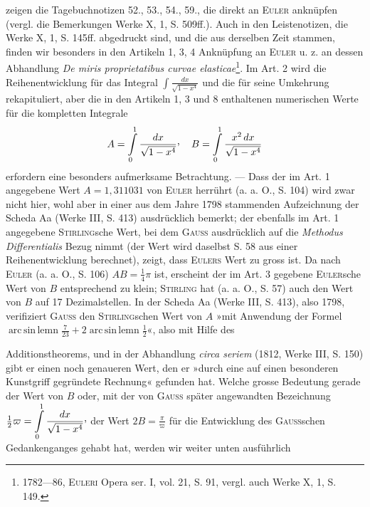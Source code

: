 zeigen die Tagebuchnotizen 52., 53., 54., 59., die direkt an \textsc{Euler} anknüpfen
(vergl. die Bemerkungen Werke X, 1, S. 509ff.). Auch in den Leistenotizen,
die Werke X, 1, S. 145ff. abgedruckt sind, und die aus derselben Zeit stammen,
finden wir besonders in den Artikeln 1, 3, 4 Anknüpfung an \textsc{Euler} u. z.
an dessen Abhandlung \textit{De miris proprietatibus curvae elasticae}\footnote{1782—86, \textsc{Euleri} Opera ser. I, vol. 21, S. 91, vergl. auch Werke X, 1, S. 149.}.
Im Art. 2 wird
die Reihenentwicklung für das Integral \(\displaystyle\int\frac{dx}{\sqrt{1-x^4}}\) und die für seine Umkehrung
rekapituliert, aber die in den Artikeln 1, 3 und 8 enthaltenen numerischen
Werte für die kompletten Integrale
\[
A=\int\limits_0^1\frac{dx}{\sqrt{1-x^4}}\mathpunct{\vcenter{\hbox{,}}}\quad
B=\int\limits_0^1\frac{x^2\,dx}{\sqrt{1-x^4}}
\]
erfordern eine besonders aufmerksame Betrachtung. — Dass der im Art. 1
angegebene Wert \(A=1{,}311031\) von \textsc{Euler} herrührt (a. a. O., S. 104) wird
zwar nicht hier, wohl aber in einer aus dem Jahre 1798 stammenden Aufzeichnung
der Scheda Aa (Werke III, S. 413) ausdrücklich bemerkt; der ebenfalls
im Art. 1 angegebene \textsc{Stirling}sche Wert, bei dem \textsc{Gauss} ausdrücklich
auf die \textit{Methodus Differentialis} Bezug nimmt (der Wert wird daselbst S. 58
aus einer Reihenentwicklung berechnet), zeigt, dass \textsc{Eulers} Wert zu gross ist.
Da nach \textsc{Euler} (a. a. O., S. 106) \(AB=\frac14\pi\) ist, erscheint der im Art. 3 gegebene
\textsc{Euler}sche Wert von \(B\) entsprechend zu klein; \textsc{Stirling} hat (a. a. O., S. 57)
auch den Wert von \(B\) auf 17 Dezimalstellen. In der Scheda Aa (Werke III,
S. 413), also 1798, verifiziert \textsc{Gauss} den \textsc{Stirling}schen Wert von \(A\) »mit Anwendung
der Formel \(\operatorname{arc\,sin\,lemn}\frac7{23}+2\operatorname{arc\,sin\,lemn}\frac12\)«, also mit Hilfe des\par
\clearpage{}
\noindent Additionstheorems, und in der Abhandlung \textit{circa seriem} (1812, Werke III,
S. 150) gibt er einen noch genaueren Wert, den er »durch eine auf einen
besonderen Kunstgriff gegründete Rechnung« gefunden hat. Welche grosse
Bedeutung gerade der Wert von \(B\) oder, mit der von \textsc{Gauss} später angewandten
Bezeichnung \(\frac12\varpi=\displaystyle\int\limits_0^1\frac{dx}{\sqrt{1-x^4}}\mathpunct{\vcenter{\hbox{,}}}\)
der Wert \(2B=\frac{\pi}{\varpi}\) für die Entwicklung
des \textsc{Gauss}schen Gedankenganges gehabt hat, werden wir weiter unten ausführlich
